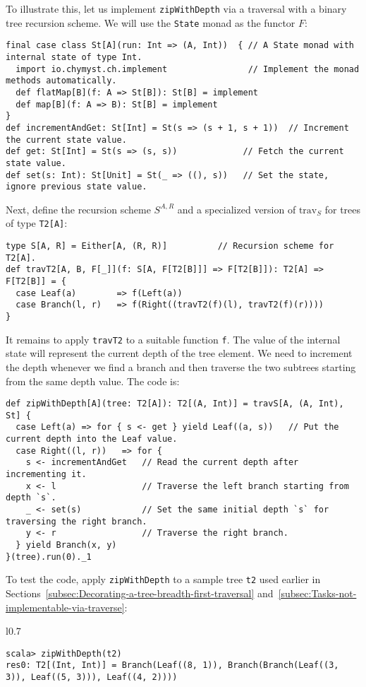 To illustrate this, let us implement \lstinline!zipWithDepth! via
a traversal with a binary tree recursion scheme. We will use the \lstinline!State!
monad as the functor $F$:
\begin{lstlisting}
final case class St[A](run: Int => (A, Int))  { // A State monad with internal state of type Int.
  import io.chymyst.ch.implement                // Implement the monad methods automatically.
  def flatMap[B](f: A => St[B]): St[B] = implement
  def map[B](f: A => B): St[B] = implement
}
def incrementAndGet: St[Int] = St(s => (s + 1, s + 1))  // Increment the current state value.
def get: St[Int] = St(s => (s, s))             // Fetch the current state value.
def set(s: Int): St[Unit] = St(_ => ((), s))   // Set the state, ignore previous state value.
\end{lstlisting}
Next, define the recursion scheme $S^{A,R}$ and a specialized version
of $\text{trav}_{S}$ for trees of type \lstinline!T2[A]!:
\begin{lstlisting}
type S[A, R] = Either[A, (R, R)]          // Recursion scheme for T2[A].
def travT2[A, B, F[_]](f: S[A, F[T2[B]]] => F[T2[B]]): T2[A] => F[T2[B]] = {
  case Leaf(a)        => f(Left(a))
  case Branch(l, r)   => f(Right((travT2(f)(l), travT2(f)(r))))
}
\end{lstlisting}
It remains to apply \lstinline!travT2! to a suitable function \lstinline!f!.
The value of the internal state will represent the current depth of
the tree element. We need to increment the depth whenever we find
a branch and then traverse the two subtrees starting from the same
depth value. The code is:
\begin{lstlisting}
def zipWithDepth[A](tree: T2[A]): T2[(A, Int)] = travS[A, (A, Int), St] {
  case Left(a) => for { s <- get } yield Leaf((a, s))   // Put the current depth into the Leaf value.
  case Right((l, r))   => for {
    s <- incrementAndGet   // Read the current depth after incrementing it.
    x <- l                 // Traverse the left branch starting from depth `s`.
    _ <- set(s)            // Set the same initial depth `s` for traversing the right branch.       
    y <- r                 // Traverse the right branch.
  } yield Branch(x, y)
}(tree).run(0)._1
\end{lstlisting}
To test the code, apply \lstinline!zipWithDepth! to a sample tree
\lstinline!t2! used earlier in Sections~\ref{subsec:Decorating-a-tree-breadth-first-traversal}
and~\ref{subsec:Tasks-not-implementable-via-traverse}:

\begin{wrapfigure}{l}{0.7\columnwidth}%
\vspace{-0.75\baselineskip}
\begin{lstlisting}
scala> zipWithDepth(t2)
res0: T2[(Int, Int)] = Branch(Leaf((8, 1)), Branch(Branch(Leaf((3, 3)), Leaf((5, 3))), Leaf((4, 2))))
\end{lstlisting}

\vspace{-0.5\baselineskip}
\end{wrapfigure}%

